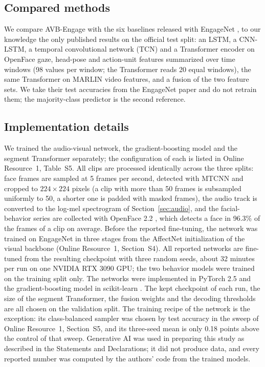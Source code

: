 \documentclass[pdflatex,iicol,sn-basic]{sn-jnl}
\newcommand{\ournet}{AVB-Engage}
\begin{document}
\subsection{Compared methods}\label{sec:baselines}

We compare \ournet{} with the six baselines released with EngageNet \citep{singh2023engagenet}, to our knowledge the only published results on the official test split: an LSTM, a CNN-LSTM, a temporal convolutional network (TCN) and a Transformer encoder on OpenFace gaze, head-pose and action-unit features summarized over time windows (98 values per window; the Transformer reads 20 equal windows), the same Transformer on MARLIN video features, and a fusion of the two feature sets. We take their test accuracies from the EngageNet paper and do not retrain them; the majority-class predictor is the second reference.

\subsection{Implementation details}\label{sec:impl}

We trained the audio-visual network, the gradient-boosting model and the segment Transformer separately; the configuration of each is listed in Online Resource~1, Table~S5. All clips are processed identically across the three splits: face frames are sampled at 5 frames per second, detected with MTCNN \citep{zhang2016mtcnn} and cropped to $224 \times 224$ pixels (a clip with more than 50 frames is subsampled uniformly to 50, a shorter one is padded with masked frames), the audio track is converted to the log-mel spectrogram of Section~\ref{sec:audio}, and the facial-behavior series are collected with OpenFace 2.2 \citep{baltrusaitis2018openface}, which detects a face in 96.3\% of the frames of a clip on average. Before the reported fine-tuning, the network was trained on EngageNet in three stages from the AffectNet initialization of the visual backbone (Online Resource~1, Section~S4). All reported networks are fine-tuned from the resulting checkpoint with three random seeds, about 32 minutes per run on one NVIDIA RTX 3090 GPU; the two behavior models were trained on the training split only. The networks were implemented in PyTorch 2.5 and the gradient-boosting model in scikit-learn \citep{pedregosa2011sklearn}. The kept checkpoint of each run, the size of the segment Transformer, the fusion weights and the decoding thresholds are all chosen on the validation split. The training recipe of the network is the exception: its class-balanced sampler was chosen by test accuracy in the sweep of Online Resource~1, Section~S5, and its three-seed mean is only 0.18 points above the control of that sweep. Generative AI was used in preparing this study as described in the Statements and Declarations; it did not produce data, and every reported number was computed by the authors' code from the trained models.
\end{document}
